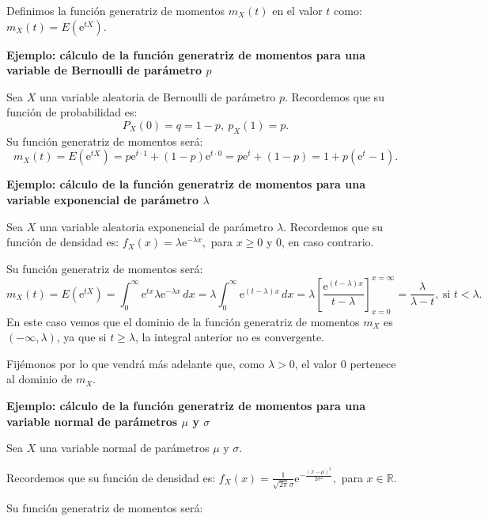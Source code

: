 \documentclass[]{book}
\begin{document}
Definimos la función generatriz de momentos \(m_X(t)\) en el valor \(t\) como: \(m_X(t)=E\left(\mathrm{e}^{tX}\right).\)

\textbf{Ejemplo: cálculo de la función generatriz de momentos para una variable de Bernoulli de parámetro \(p\)}

Sea \(X\) una variable aleatoria de Bernoulli de parámetro \(p\). Recordemos que su función de probabilidad es:
\[
P_X(0)=q=1-p,\ p_X(1)=p.
\]
Su función generatriz de momentos será:
\[
m_X (t)=E\left(\mathrm{e}^{tX}\right) =p\mathrm{e}^{t\cdot 1}+(1-p)\mathrm{e}^{t\cdot 0}=p\mathrm{e}^t+(1-p)=1+p\left(\mathrm{e}^t -1 \right).
\]

\textbf{Ejemplo: cálculo de la función generatriz de momentos para una variable exponencial de parámetro \(\lambda\)}

Sea \(X\) una variable aleatoria exponencial de parámetro \(\lambda\). Recordemos que su función de densidad es: \(f_X(x)=\lambda \mathrm{e}^{-\lambda x},\) para \(x\geq 0\) y \(0\), en caso contrario.

Su función generatriz de momentos será:
\[
m_X (t)=E\left(\mathrm{e}^{tX}\right)=\int_0^\infty \mathrm{e}^{t x}\lambda \mathrm{e}^{-\lambda x}\, dx = \lambda \int_0^\infty\mathrm{e}^{(t-\lambda)x}\, dx = \lambda\left[\frac{\mathrm{e}^{(t-\lambda)x}}{t-\lambda}\right]_{x=0}^{x=\infty} = \frac{\lambda}{\lambda -t},\ \mbox{si } t<\lambda. 
\]
En este caso vemos que el dominio de la función generatriz de momentos \(m_X\) es \((-\infty,\lambda)\), ya que si \(t\geq \lambda\), la integral anterior no es convergente.

Fijémonos por lo que vendrá más adelante que, como \(\lambda >0\), el valor \(0\) pertenece al dominio de \(m_X\).

\textbf{Ejemplo: cálculo de la función generatriz de momentos para una variable normal de parámetros \(\mu\) y \(\sigma\)}

Sea \(X\) una variable normal de parámetros \(\mu\) y \(\sigma\).

Recordemos que su función de densidad es: \(f_X(x)=\frac{1}{\sqrt{2\pi}\sigma}\mathrm{e}^{-\frac{(x-\mu)^2}{2\sigma^2}},\) para \(x\in \mathbb{R}\).

Su función generatriz de momentos será:
\end{document}
